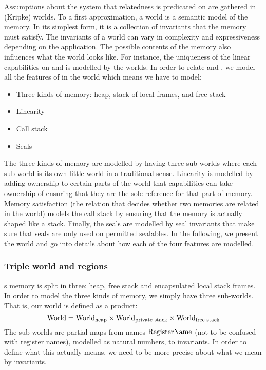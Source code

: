 \begin{jversion}
Assumptions about the system that relatedness is predicated on are gathered in (Kripke) worlds.
To a first approximation, a world is a semantic model of the memory.
In its simplest form, it is a collection of invariants that the memory must satisfy.
The invariants of a world can vary in complexity and expressiveness depending on the application.
The possible contents of the memory also influences what the world looks like.
For instance, the uniqueness of the linear capabilities on \trgcm{} and \srccm{} is modelled by the worlds.
In order to relate \trgcm{} and \srccm{}, we model all the features of \srccm{} in the world which means we have to model:
\begin{itemize}
\item Three kinds of memory: heap, stack of local frames, and free stack
\item Linearity
\item Call stack
\item Seals
\end{itemize}
The three kinds of memory are modelled by having three sub-worlds where each sub-world is its own little world in a traditional sense.
Linearity is modelled by adding ownership to certain parts of the world that capabilities can take ownership of ensuring that they are the sole reference for that part of memory.
Memory satisfaction (the relation that decides whether two memories are related in the world) models the call stack by ensuring that the memory is actually shaped like a stack.
Finally, the seals are modelled by seal invariants that make sure that seals are only used on permitted sealables.
In the following, we present the world and go into details about how each of the four features are modelled.

\subsubsection{Triple world and regions}
\srccm{}s memory is split in three: heap, free stack and encapsulated local stack frames.
In order to model the three kinds of memory, we simply have three sub-worlds.
That is, our world is defined as a product:
\[
  \mathrm{World} = \mathrm{World}_\mathrm{heap} \times \mathrm{World}_\text{private stack} \times \mathrm{World}_\text{free stack}
\]
The sub-worlds are partial maps from names $\mathrm{RegisterName}$ (not to be confused with register names), modelled as natural numbers, to invariants.
In order to define what this actually means, we need to be more precise about what we mean by invariants.


\end{jversion}
